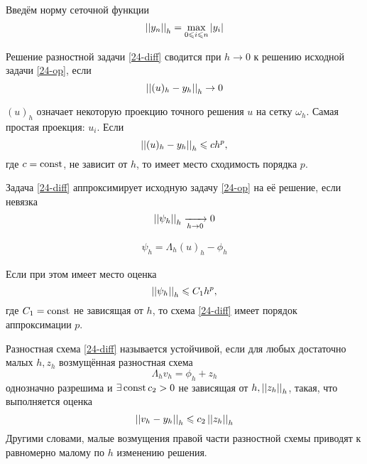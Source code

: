 Введём норму сеточной функции
\begin{equation}
  \left\lvert \left\lvert y_n \right\rvert \right\rvert_h = \underset{0 \leqslant i \leqslant n}{\max}\left\lvert y_i \right\rvert
\end{equation}

\begin{definition}
  Решение разностной задачи \eqref{24-diff} сводится при $h \to 0$ к решению исходной
  задачи \eqref{24-op}, если
  \begin{equation}
    \left\lvert\left\lvert(u)_h - y_h\right\rvert\right\rvert_h \to 0
  \end{equation}
\end{definition}
$(u)_h$ означает некоторую проекцию точного решения $u$ на сетку $\omega_h$. Самая
простая проекция: $u_i$. Если
\begin{equation}
  \left\lvert\left\lvert(u)_h - y_h\right\rvert\right\rvert_h \leqslant ch^p,
\end{equation}
где $c = \operatorname{\text{const}}$, не зависит от $h$, то имеет место сходимость порядка $p$.

\begin{definition}
  Задача \eqref{24-diff} аппроксимирует исходную задачу \eqref{24-op} на её решение,
  если невязка
  \begin{equation}
    \left\lvert\left\lvert\psi_h\right\rvert\right\rvert_h \xrightarrow[h \to 0]{} 0
  \end{equation}
\end{definition}
\begin{align*}
  \psi_h = \Lambda_h(u)_h - \phi_h
\end{align*}

Если при этом имеет место оценка
\begin{equation}
  \left\lvert\left\lvert\psi_h\right\rvert\right\rvert_h \leqslant C_1h^p,
\end{equation}
где $C_1 = \operatorname{\text{const}}$ не зависящая от $h$, то схема \eqref{24-diff} имеет порядок
аппроксимации $p$.

\begin{definition}
  Разностная схема \eqref{24-diff} называется устойчивой, если для любых достаточно
  малых $h, z_h$ возмущённая разностная схема
  \begin{equation}
    \Lambda_hv_h = \phi_h + z_h
  \end{equation}
  однозначно разрешима и $\exists \operatorname{\text{const}} c_2 > 0$ не зависящая от $h, \left\lvert\left\lvert z_h\right\rvert\right\rvert_h$,
  такая, что выполняется оценка
  \begin{equation}
    \left\lvert\left\lvert v_h - y_h\right\rvert\right\rvert_h \leqslant c_2\left\lvert\left\lvert z_h\right\rvert\right\rvert_h
  \end{equation}
  Другими словами, малые возмущения правой части разностной схемы приводят к равномерно
  малому по $h$ изменению решения.
\end{definition}

